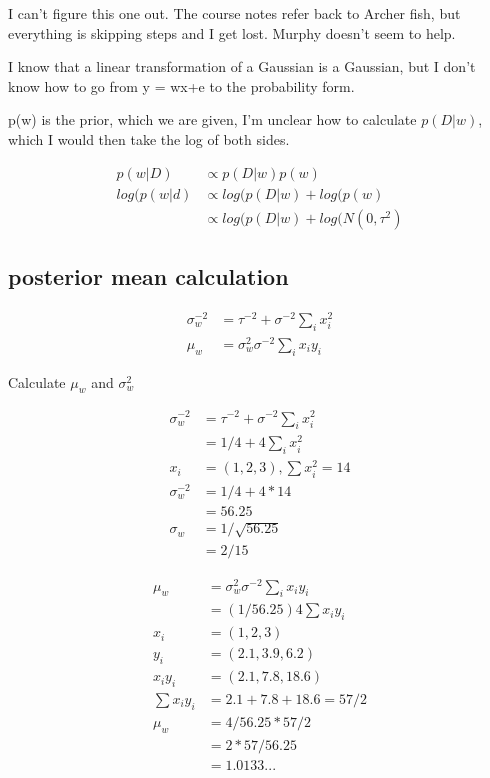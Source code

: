 \documentclass[11pt]{article}
\begin{document}
I can't figure this one out. The course notes refer back to Archer fish, but everything is skipping steps and I get lost. Murphy doesn't seem to help.

I know that a linear transformation of a Gaussian is a Gaussian, but I don't know how to go from y = wx+e to the probability form.

p(w) is the prior, which we are given, I'm unclear how to calculate $p(D|w)$, which I would then take the log of both sides.

\begin{align}
	p(w|D) &\propto p(D|w)p(w) \\
	log(p(w|d) &\propto log(p(D|w) + log(p(w) \\
	&\propto log(p(D|w) + log(N(0,\tau^2)
\end{align}

\subsection{posterior mean calculation}

\begin{align}
	\sigma_w^{-2}  &= \tau^{-2} + \sigma^{-2} \sum_{i} x_i^2 \\
	\mu_w &= \sigma_w^2 \sigma^{-2} \sum_{i} x_iy_i
\end{align}

Calculate $\mu_w$ and $\sigma_w^{2}$

\begin{align}
	\sigma_w^{-2}  &= \tau^{-2} + \sigma^{-2} \sum_{i} x_i^2 \\
	               &= 1/4 + 4 \sum_{i} x_i^2 \\
	x_i &= (1,2,3), \sum x_i^2 = 14 \\
	\sigma_w^{-2} &= 1/4 + 4 * 14\\
	&= 56.25 \\
	\sigma_w &=  1/\sqrt{56.25} \\
	&= 2/15
\end{align}

\begin{align}
	\mu_w &= \sigma_w^2 \sigma^{-2} \sum_{i} x_iy_i \\
		  &= (1/56.25)	4 \sum x_iy_i \\
	x_i &= (1,2,3) \\		  
	y_i &= (2.1, 3.9, 6.2) \\
	x_iy_i &= (2.1, 7.8, 18.6) \\
	\sum x_iy_i &= 2.1+7.8+18.6 = 57/2 \\
	\mu_w  &= 4/56.25 * 57/2 \\
	       &= 2 * 57/56.25 \\
	       &= 1.0133... \\
\end{align}
\end{document}
